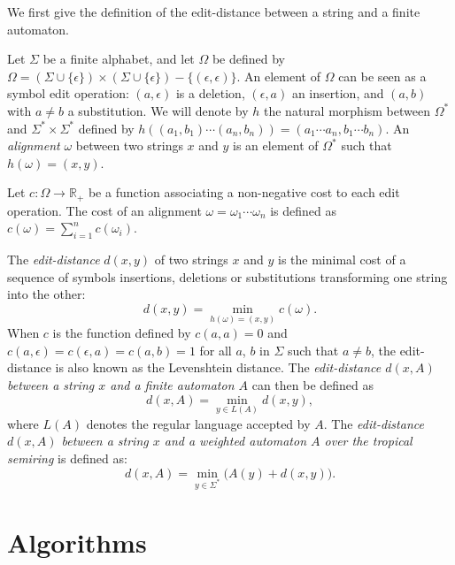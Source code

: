 \documentclass{llncs}
\def\Rset{\mathbb{R}}
\newcommand{\set}[1]{\{#1\}}
\newcommand{\0}{\overline{0}}
\newcommand{\1}{\overline{1}}
\newcommand{\+}{\oplus}
\renewcommand{\.}{\otimes}
\begin{document}
We first give the definition of the edit-distance between a string and
a finite automaton.

Let $\Sigma$ be a finite alphabet, and let $\Omega$ be defined by
$\Omega = (\Sigma \cup \set{\epsilon}) \times (\Sigma \cup
\set{\epsilon}) - \set{(\epsilon, \epsilon)}$. An element of $\Omega$
can be seen as a symbol edit operation: $(a,\epsilon)$ is a deletion,
$(\epsilon, a)$ an insertion, and $(a, b)$ with $a \neq b$ a
substitution.  We will denote by $h$ the natural morphism between
$\Omega^*$ and $\Sigma^* \times \Sigma^*$ defined by $h((a_1, b_1)
\cdots (a_n, b_n)) = (a_1 \cdots a_n, b_1 \cdots b_n)$. An {\em
  alignment} $\omega$ between two strings $x$ and $y$ is an element of
$\Omega^*$ such that $h(\omega) = (x,y)$.

Let $c : \Omega \rightarrow \Rset_+$ be a function associating a
non-negative cost to each edit operation. The cost of an alignment
$\omega = \omega_1 \cdots \omega_n$ is defined as $c(\omega) =
\sum_{i=1}^n c(\omega_i)$.

\begin{definition}
  The {\em edit-distance} $d(x, y)$ of two strings $x$ and $y$ is the
  minimal cost of a sequence of symbols insertions, deletions or
  substitutions transforming one string into the other:
\begin{equation}
d(x, y) = \min_{h(\omega) = (x, y)} c(\omega).
\end{equation}
  When $c$ is the function defined by $c(a, a) = 0$ and $c(a,
  \epsilon) = c(\epsilon, a) = c(a,b) = 1$ for all $a$, $b$ in
  $\Sigma$ such that $a \not= b$, the edit-distance is also known as
  the Levenshtein distance. The {\em edit-distance $d(x, A)$ between a
  string $x$ and a finite automaton $A$} can then be defined as
\begin{equation}
d(x, A) = \min_{y \in L(A)} d(x, y),
\end{equation}
  where $L(A)$ denotes the regular language accepted by $A$. The {\em
  edit-distance $d(x,A)$ between a string $x$ and a weighted automaton
  $A$ over the tropical semiring} is defined as:
\begin{equation}
d(x,A) = \min_{y \in \Sigma^*} \bigl(A(y) + d(x, y)\bigr).
\end{equation}
\end{definition}

\section{Algorithms}
\label{sec:algo}
\end{document}
